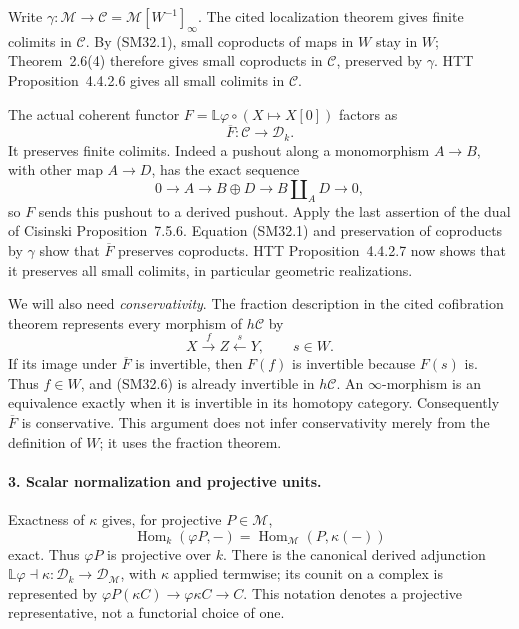 Write \(\gamma:\mathcal M\to\mathcal C=
\mathcal M[W^{-1}]_\infty\).  The cited localization theorem
gives finite colimits in \(\mathcal C\).  By (SM32.1), small
coproducts of maps in \(W\) stay in \(W\); Theorem~2.6(4)
therefore gives small coproducts in \(\mathcal C\), preserved
by \(\gamma\).  HTT Proposition~4.4.2.6 gives all small
colimits in \(\mathcal C\).

The actual coherent functor
\(F=\mathbb L\varphi\circ(X\mapsto X[0])\) factors as
\[
             \overline F:\mathcal C\longrightarrow\mathcal D_k.
                                                               \tag{SM32.5}
\]
It preserves finite colimits.  Indeed a pushout along a
monomorphism \(A\to B\), with other map \(A\to D\), has
the exact sequence
\[
 0\longrightarrow A\longrightarrow B\oplus D
                   \longrightarrow B\amalg_A D\longrightarrow0,
\]
so \(F\) sends this pushout to a derived pushout.  Apply the
last assertion of the dual of Cisinski Proposition~7.5.6.
Equation (SM32.1) and preservation of coproducts by
\(\gamma\) show that \(\overline F\) preserves coproducts.
HTT Proposition~4.4.2.7 now shows that it preserves all small
colimits, in particular geometric realizations.

We will also need \emph{conservativity}.  The fraction
description in the cited cofibration theorem represents every
morphism of \(h\mathcal C\) by
\[
                  X\xrightarrow{f}Z\xleftarrow{s}Y,
                       \qquad s\in W.                        \tag{SM32.6}
\]
If its image under \(\overline F\) is invertible, then
\(F(f)\) is invertible because \(F(s)\) is.  Thus
\(f\in W\), and (SM32.6) is already invertible in
\(h\mathcal C\).  An \(\infty\)-morphism is an equivalence
exactly when it is invertible in its homotopy category.
Consequently \(\overline F\) is conservative.  This argument
does not infer conservativity merely from the definition of
\(W\); it uses the fraction theorem.

\paragraph{3. Scalar normalization and projective units.}
Exactness of \(\kappa\) gives, for projective \(P\in\mathcal M\),
\[
 \operatorname{Hom}_k(\varphi P,-)
                  =\operatorname{Hom}_{\mathcal M}(P,\kappa(-))
\]
exact.  Thus \(\varphi P\) is projective over \(k\).
There is the canonical derived adjunction
\(\mathbb L\varphi\dashv\kappa:\mathcal D_k\to
\mathcal D_{\mathcal M}\), with \(\kappa\) applied termwise;
its counit on a complex is represented by
\(\varphi P(\kappa C)\to\varphi\kappa C\to C\).
This notation denotes a projective representative, not a
functorial choice of one.

